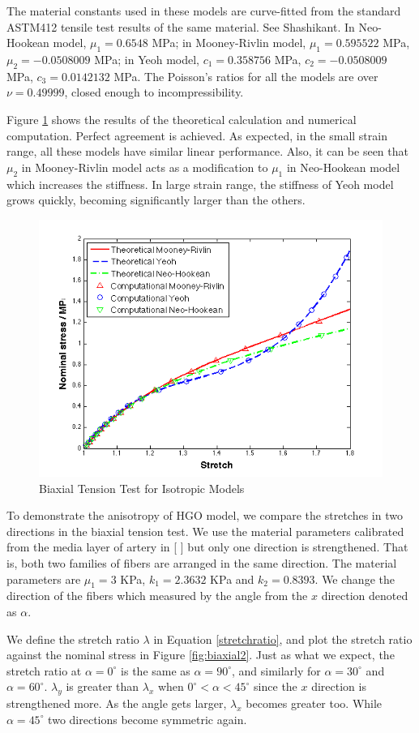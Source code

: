 The material constants used in these models are curve-fitted from the standard ASTM412 tensile test results of the same material. See Shashikant. In Neo-Hookean model, $\mu_1 = 0.6548$ MPa; in Mooney-Rivlin model, $\mu_1 = 0.595522$ MPa, $\mu_2 = -0.0508009$ MPa; in Yeoh model, $c_1 = 0.358756$ MPa, $c_2 = - 0.0508009$ MPa, $c_3 = 0.0142132$ MPa. The Poisson's ratios for all the models are over $\nu = 0.49999$, closed enough to incompressibility.

Figure \ref{fig:biaxial1} shows the results of the theoretical calculation and numerical computation. Perfect agreement is achieved. As expected, in the small strain range, all these models have similar linear performance. Also, it can be seen that $\mu_2$ in Mooney-Rivlin model acts as a modification to $\mu_1$ in Neo-Hookean model which increases the stiffness. In large strain range, the stiffness of Yeoh model grows quickly, becoming significantly larger than the others.

\begin{figure}[h!]
\centering
\includegraphics[width=.6\textwidth]{./figures/biaxial1.png}
\caption{Biaxial Tension Test for Isotropic Models}
\label{fig:biaxial1}
\end{figure}

To demonstrate the anisotropy of HGO model, we compare the stretches in two directions in the biaxial tension test. We use the material parameters calibrated from the media layer of artery in [ ] but only one direction is strengthened. That is, both two families of fibers are arranged in the same direction. The material parameters are $\mu_1 = 3$ KPa, $k_1 = 2.3632$ KPa and $k_2 = 0.8393$. We change the direction of the fibers which measured by the angle from the $x$ direction denoted as $\alpha$. 

We define the stretch ratio $\lambda$ in Equation \ref{stretchratio}, and plot the stretch ratio against the nominal stress in Figure \ref{fig:biaxial2}. Just as what we expect, the stretch ratio at $\alpha = 0^\circ$ is the same as $\alpha = 90^\circ$, and similarly for $\alpha = 30^\circ$ and $\alpha = 60^\circ$. 
$\lambda_y$ is greater than $\lambda_x$ when $0^\circ < \alpha < 45^\circ$ since the $x$ direction is strengthened more. As the angle gets larger, $\lambda_x$ becomes greater too. While $\alpha = 45^\circ$ two directions become symmetric again.

